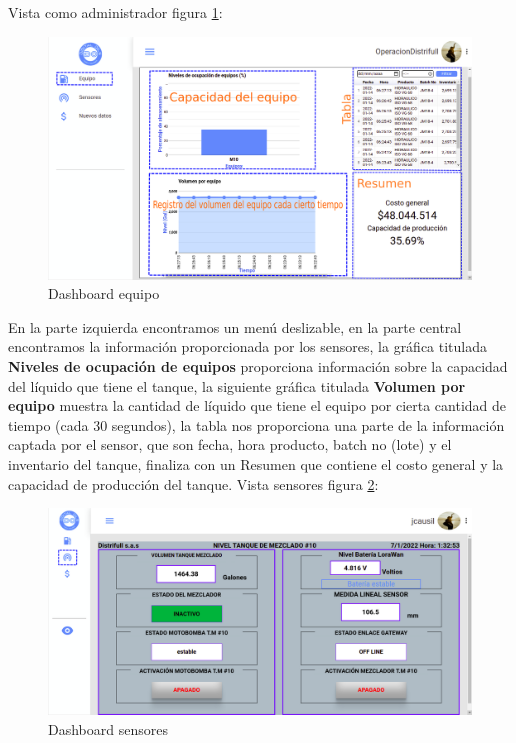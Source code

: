 Vista como administrador figura \ref{fig:dashboardInicio}: 


\begin{figure}[h!]
	\centering
	\includegraphics[width=1\linewidth, height=0.45\textheight]{imagenes/dashboardInicio}
	\caption[Dashboard equipo.]{Dashboard equipo}
	\label{fig:dashboardInicio}
\end{figure}

En la parte izquierda encontramos un men\'u deslizable, en la parte central encontramos la informaci\'on proporcionada por los sensores, la gr\'afica titulada {\bf Niveles de ocupaci\'on de equipos} proporciona informaci\'on sobre la capacidad del l\'iquido que tiene el tanque, la siguiente gr\'afica titulada {\bf Volumen por equipo} muestra la cantidad de l\'iquido que tiene el equipo por cierta cantidad de tiempo (cada 30 segundos), la tabla nos proporciona una parte de la informaci\'on captada por el sensor, que son fecha, hora producto, batch no (lote) y el inventario del tanque, finaliza con un \textcolor{orangedistri}{Resumen} que contiene el costo general y la capacidad de producci\'on del tanque.
\newpage
Vista sensores figura \ref{fig:dashboardSensores}: 
\begin{figure}[h!]
	\centering
	\includegraphics[width=1\linewidth, height=0.4\textheight]{imagenes/dashboardSensores}
	\caption[Dashboard sensores.]{Dashboard sensores}
	\label{fig:dashboardSensores}
\end{figure}

